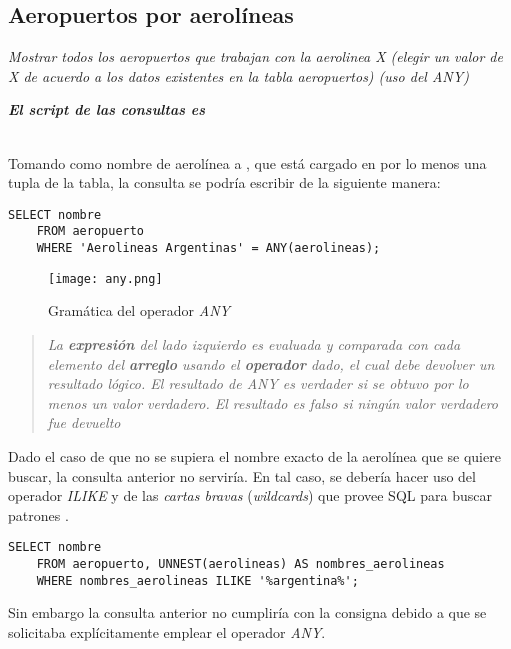 \subsection{Aeropuertos por aerolíneas}
\emph{Mostrar todos los aeropuertos que trabajan con la aerolinea X (elegir un valor de X de acuerdo a los datos existentes en la tabla aeropuertos) (uso del ANY)} 

\emph{\textbf{El script de las consultas es }} 
\\~

Tomando como nombre de aerolínea a , que está cargado en por lo menos una tupla de la tabla, la consulta se podría escribir de la siguiente manera:

\vspace*{5mm}
\lstset{style=sql}
\begin{lstlisting}
SELECT nombre
    FROM aeropuerto 
    WHERE 'Aerolineas Argentinas' = ANY(aerolineas);
\end{lstlisting}

\begin{figure}[H]
    \texttt{[image: any.png]}
    \caption{Gramática del operador \emph{ANY} \cite{any}}
\end{figure}

\begin{quote}\itshape
    La \textbf{expresión} del lado izquierdo es evaluada y comparada con cada elemento del \textbf{arreglo} usando el \textbf{operador} dado, el cual debe devolver un resultado lógico. El resultado de \emph{ANY} es verdader si se obtuvo por lo menos un valor verdadero. El resultado es falso si ningún valor verdadero fue devuelto \cite{any}    
\end{quote}

Dado el caso de que no se supiera el nombre exacto de la aerolínea que se quiere buscar, la consulta anterior no serviría. En tal caso, se debería hacer uso del operador \emph{ILIKE} y de las \emph{cartas bravas} (\emph{wildcards}) que provee SQL para buscar patrones \cite{pattern}.

\vspace*{5mm}
\lstset{style=sql}
\begin{lstlisting}
SELECT nombre
    FROM aeropuerto, UNNEST(aerolineas) AS nombres_aerolineas 
    WHERE nombres_aerolineas ILIKE '%argentina%';
\end{lstlisting}

Sin embargo la consulta anterior no cumpliría con la consigna debido a que se solicitaba explícitamente emplear el operador \emph{ANY}.

